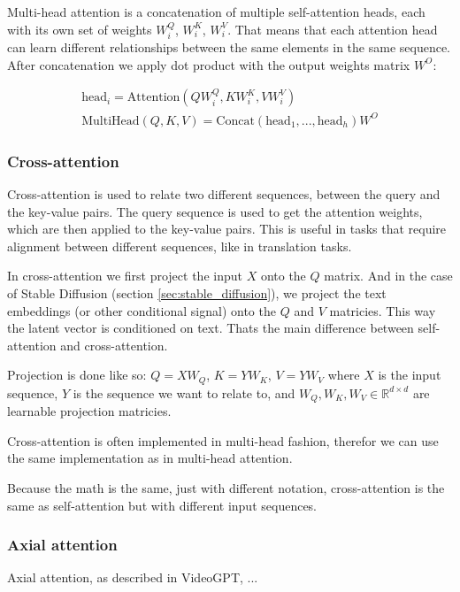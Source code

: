 Multi-head attention is a concatenation of multiple self-attention heads, each with its own set of weights $W_i^Q$, $W_i^K$, $W_i^V$. That means that each attention head can learn different relationships between the same elements in the same sequence. After concatenation we apply dot product with the output weights matrix $W^O$:

\begin{equation}
    \begin{aligned}
        \text{head}_i = \text{Attention}(QW_i^Q, KW_i^K, VW_i^V)  \\
        \text{MultiHead}(Q, K, V) = \text{Concat}(\text{head}_1, ..., \text{head}_h)W^O
    \end{aligned}
\end{equation}









\subsubsection{Cross-attention}

Cross-attention is used to relate two different sequences, between the query and the key-value pairs. The query sequence is used to get the attention weights, which are then applied to the key-value pairs. This is useful in tasks that require alignment between different sequences, like in translation tasks.

In cross-attention we first project the input $X$ onto the $Q$ matrix. And in the case of Stable Diffusion (section \ref{sec:stable_diffusion}), we project the text embeddings (or other conditional signal) onto the $Q$ and $V$ matricies. This way the latent vector is conditioned on text. Thats the main difference between self-attention and cross-attention.

Projection is done like so: $Q = XW_Q$, $K = YW_K$, $V = YW_V$ where $X$ is the input sequence, $Y$ is the sequence we want to relate to, and $W_Q, W_K, W_V \in \mathbb{R}^{d \times d}$ are learnable projection matricies.

Cross-attention is often implemented in multi-head fashion, therefor we can use the same implementation as in multi-head attention.

Because the math is the same, just with different notation, cross-attention is the same as self-attention but with different input sequences.







\subsubsection{Axial attention}

Axial attention, as described in VideoGPT, ...












